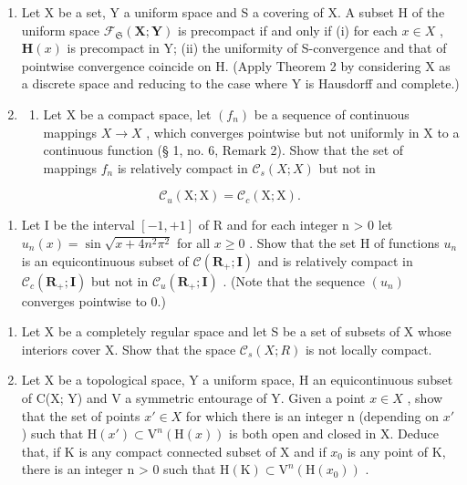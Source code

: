 \begin{enumerate}
\def\labelenumi{\arabic{enumi})}
\setcounter{enumi}{8}
\item
  Let X be a set, Y a uniform space and S a covering of X. A subset H of the uniform space \(\mathcal{F}_{\mathfrak{S}}(\mathbf{X};\mathbf{Y})\) is precompact if and only if (i) for each \(x\in X\) , \(\mathbf{H}(x)\) is precompact in Y; (ii) the uniformity of S-convergence and that of pointwise convergence coincide on H. (Apply Theorem 2 by considering X as a discrete space and reducing to the case where Y is Hausdorff and complete.)
\item
  \begin{enumerate}
  \def\labelenumii{\alph{enumii})}
  \tightlist
  \item
    Let X be a compact space, let \((f_{n})\) be a sequence of continuous mappings \(X \rightarrow X\) , which converges pointwise but not uniformly in X to a continuous function (§ 1, no. 6, Remark 2). Show that the set of mappings \(f_{n}\) is relatively compact in \(\mathcal{C}_{s}(X; X)\) but not in
  \end{enumerate}
\end{enumerate}

\[
\mathcal {C} _ {u} (\mathrm{X}; \mathrm{X}) = \mathcal {C} _ {c} (\mathrm{X}; \mathrm{X}).
\]

\begin{enumerate}
\def\labelenumi{\alph{enumi})}
\setcounter{enumi}{1}
\tightlist
\item
  Let I be the interval \([-1, +1]\) of R and for each integer n \textgreater{} 0 let \(u_{n}(x) = \sin \sqrt{x + 4n^{2}\pi^{2}}\) for all \(x \geqslant 0\) . Show that the set H of functions \(u_{n}\) is an equicontinuous subset of \(\mathcal{C}(\mathbf{R}_{+}; \mathbf{I})\) and is relatively compact in \(\mathcal{C}_{c}(\mathbf{R}_{+}; \mathbf{I})\) but not in \(\mathcal{C}_{u}(\mathbf{R}_{+}; \mathbf{I})\) . (Note that the sequence \((u_{n})\) converges pointwise to 0.)
\end{enumerate}

\begin{enumerate}
\def\labelenumi{\arabic{enumi})}
\setcounter{enumi}{10}
\item
  Let X be a completely regular space and let S be a set of subsets of X whose interiors cover X. Show that the space \(\mathcal{C}_{s}(X;R)\) is not locally compact.
\item
  Let X be a topological space, Y a uniform space, H an equicontinuous subset of C(X; Y) and V a symmetric entourage of Y. Given a point \(x \in X\) , show that the set of points \(x' \in X\) for which there is an integer n (depending on \(x'\) ) such that \(\mathrm{H}(x') \subset \mathrm{V}^n(\mathrm{H}(x))\) is both open and closed in X. Deduce that, if K is any compact connected subset of X and if \(x_0\) is any point of K, there is an integer n \textgreater{} 0 such that \(\mathrm{H}(\mathrm{K}) \subset \mathrm{V}^n(\mathrm{H}(x_0))\) .
\end{enumerate}

